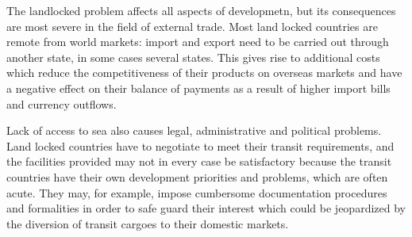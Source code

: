 \documentclass[
  openany]{book}
\begin{document}
The landlocked problem affects all aspects of developmetn, but its consequences are most severe in the field of external trade. Most land locked countries are remote from world markets: import and export need to be carried out through another state, in some cases several states. This gives rise to additional costs which reduce the competitiveness of their products on overseas markets and have a negative effect on their balance of payments as a result of higher import bills and currency outflows.

Lack of access to sea also causes legal, administrative and political problems. Land locked countries have to negotiate to meet their transit requirements, and the facilities provided may not in every case be satisfactory because the transit countries have their own development priorities and problems, which are often acute. They may, for example, impose cumbersome documentation procedures and formalities in order to safe guard their interest which could be jeopardized by the diversion of transit cargoes to their domestic markets.
\end{document}
